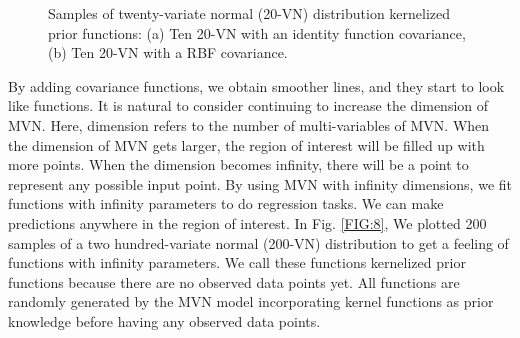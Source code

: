 \documentclass[preprint,12pt]{elsarticle}
\begin{document}
\begin{figure}[h!]
    \centering
    \qquad
    \caption{Samples of twenty-variate normal (20-VN) distribution kernelized prior functions: (a) Ten 20-VN with an identity function covariance, (b) Ten 20-VN with a RBF covariance.}
    \label{FIG:7}
\end{figure}

By adding covariance functions, we obtain smoother lines, and they start to look like functions. It is natural to consider continuing to increase the dimension of MVN. Here, dimension refers to the number of multi-variables of MVN. When the dimension of MVN gets larger, the region of interest will be filled up with more points. When the dimension becomes infinity, there will be a point to represent any possible input point. By using MVN with infinity dimensions, we fit functions with infinity parameters to do regression tasks. We can make predictions anywhere in the region of interest. In Fig. \ref{FIG:8}, We plotted 200 samples of a two hundred-variate normal (200-VN) distribution to get a feeling of functions with infinity parameters. We call these functions kernelized prior functions because there are no observed data points yet. All functions are randomly generated by the MVN model incorporating kernel functions as prior knowledge before having any observed data points. 
\end{document}
